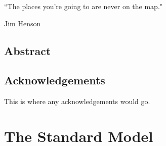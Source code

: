 \documentclass[oneside, letterpaper, 12pt, oldfontcommands]{memoir}
\begin{document}
\frontmatter


\thetitlepage
\clearpage
``The places you're going to are never on the map."

Jim Henson
\thecopyrightpage
\cleardoublepage

\setcounter{page}{1}

\section{Abstract}
\uwabstract
\cleardoublepage

\section{Acknowledgements}
This is where any acknowledgements would go.
\clearpage

\tableofcontents* %

\makeatletter
     \renewcommand*\l@figure{\@dottedtocline{1}{1em}{3.2em}}
\makeatother
 \listoffigures*  %
 \listoftables   %

\mainmatter

\chapter{The Standard Model}





 
 
 
 
 
 
 









%
%


\end{document}
